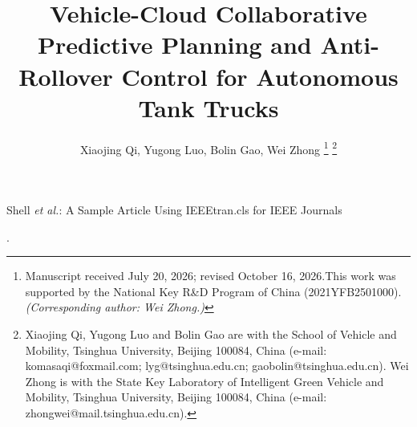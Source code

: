 \documentclass[lettersize,journal]{IEEEtran}
\begin{document}
\title{Vehicle-Cloud Collaborative Predictive Planning and Anti-Rollover Control for Autonomous Tank Trucks}

\author{Xiaojing Qi, Yugong Luo, Bolin Gao, Wei Zhong
\thanks{Manuscript received July 20, 2026; revised October 16, 2026.This work was supported by the National Key R\&D Program of China (2021YFB2501000).\textit{(Corresponding author: Wei Zhong.)}} 
\thanks{Xiaojing Qi, Yugong Luo and Bolin Gao are with the School of Vehicle and Mobility, Tsinghua University, Beijing 100084, China (e-mail: komasaqi@foxmail.com; lyg@tsinghua.edu.cn; gaobolin@tsinghua.edu.cn). Wei Zhong is with the State Key Laboratory of Intelligent Green Vehicle and Mobility, Tsinghua University, Beijing 100084, China (e-mail: zhongwei@mail.tsinghua.edu.cn).}}

%
{Shell \MakeLowercase{\textit{et al.}}: A Sample Article Using IEEEtran.cls for IEEE Journals}
\maketitle
\allowdisplaybreaks[4]. 



















\vspace{11pt}



\vfill
\end{document}
